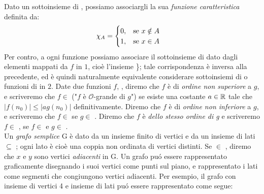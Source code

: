 Dato un sottoinsieme  di , possiamo associargli la sua \textit{funzione caratteristica}  definita da:
\begin{equation}
    \chi_A = 
    \begin{cases}
        0, \hspace{3mm} \textnormal{se } x \notin A \\
        1, \hspace{3mm} \textnormal{se } x \in A \\
    \end{cases}
\end{equation}
Per contro, a ogni funzione  possiamo associare il sottoinsieme di  dato dagli elementi mappati da $f$ in $1$, cioè l'insieme \}; tale corrispondenza è inversa alla precedente, ed è quindi naturalmente equivalente considerare sottoinsiemi di  o funzioni di  in $2$.
Date due funzioni $f$, , diremo che $f$ è di \textit{ordine non superiore} a $g$, e scriveremo che $f \in$  ("$f$ è $\mathcal{O}$-grande di $g$") se esiste una costante $a \in \mathbb{R}$ tale che $|f(n_0)| \leq |a g(n_0)|$ definitivamente. Diremo che $f$ è di \textit{ordine non inferiore} a $g$, e scriveremo che $f \in$  se $g \in$ . Diremo che $f$ è \textit{dello stesso ordine di g} e scriveremo $f \in$ , se $f \in$  e $g \in$ .\\
Un \textit{grafo semplice} G è dato da un insieme finito di vertici  e da un insieme di lati  $\subseteq$ ; ogni lato è cioè una coppia non ordinata di vertici distinti. Se  $\in$ , diremo che $x$ e $y$ sono vertici \textit{adiacenti} in G. Un grafo puó essere rappresentato graficamente disegnando i suoi vertici come punti sul piano, e rappresentato i lati come segmenti che congiungono vertici adiacenti. Per esempio, il grafo con insieme di vertici 4 e insieme di lati   puó essere rappresentato come segue:\\


